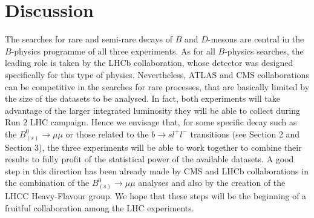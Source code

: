 %
%
%
%
%
%
%
%
%
\section{Discussion}
The searches for rare and semi-rare decays of $B$ and $D$-mesons are central in the $B$-physics programme of all three experiments. As for all $B$-physics searches, the leading role is taken by the LHCb collaboration, whose detector was designed specifically for this type of physics. Nevertheless, ATLAS and CMS collaborations can be competitive in the searches for rare processes, that are basically limited by the size of the datasets to be analysed. In fact, both experiments will take advantage of the larger integrated luminosity they will be able to collect during Run 2 LHC campaign. Hence we envisage that, for some specific decay such as the $B_{(s)}^0 \to \mu \mu$ or those related to the $b \to s l^+ l^-$ transitions (see Section 2 and Section 3), the three experiments will be able to work together to combine their results to fully profit of the statistical power of the available datasets. A good step in this direction has been already made by CMS and LHCb collaborations in the combination of the $B_{(s)}^0 \to \mu \mu$ analyses and also by the creation of the LHCC Heavy-Flavour group. We hope that these steps will be the beginning of a fruitful collaboration among the LHC experiments.
%
